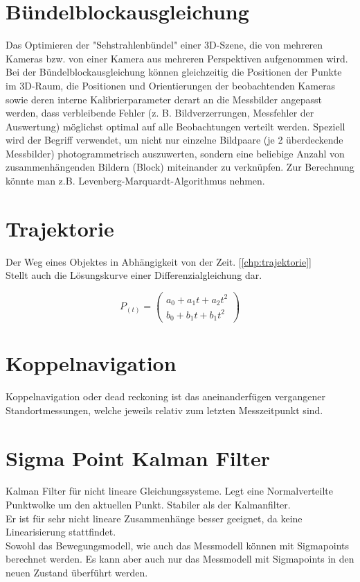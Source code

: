 \section{Bündelblockausgleichung}
\label{chp:stoffübersicht:sec:Bündelblockausgleichung}
Das Optimieren der "Sehstrahlenbündel" einer 3D-Szene, die von mehreren Kameras bzw. von einer Kamera aus mehreren Perspektiven
aufgenommen wird. Bei der Bündelblockausgleichung können gleichzeitig die Positionen der Punkte im 3D-Raum, die Positionen und
Orientierungen der beobachtenden Kameras sowie deren interne Kalibrierparameter derart an die Messbilder angepasst werden, dass
verbleibende Fehler (z. B. Bildverzerrungen, Messfehler der Auswertung) möglichst optimal auf alle Beobachtungen verteilt werden.
Speziell wird der Begriff verwendet, um nicht nur einzelne Bildpaare (je 2 überdeckende Messbilder) photogrammetrisch auszuwerten,
sondern eine beliebige Anzahl von zusammenhängenden Bildern (Block) miteinander zu verknüpfen. Zur Berechnung könnte man z.B.
Levenberg-Marquardt-Algorithmus nehmen. 

\section{Trajektorie}
\label{chp:stoffübersicht:sec:Trajektorie}
Der Weg eines Objektes in Abhängigkeit von der Zeit. [\ref{chp:trajektorie}]\\
Stellt auch die Lösungskurve einer Differenzialgleichung dar.

\begin{equation}
P_{(t)} = 
\left(
	\begin{array}{c}
	a_0 + a_1t + a_2t^2 \\
	b_0 + b_1t + b_1t^2
	\end{array} 
\right)
\end{equation} 

\section{Koppelnavigation}
\label{chp:stoffübersicht:sec:Koppelnavigation}
Koppelnavigation oder dead reckoning ist das aneinanderfügen vergangener Standortmessungen, welche jeweils relativ zum letzten Messzeitpunkt sind.

\section{Sigma Point Kalman Filter}
\label{chp:stoffübersicht:sec:SigmaPointKalmanFilter}
Kalman Filter für nicht lineare Gleichungssysteme. Legt eine Normalverteilte Punktwolke um den aktuellen Punkt. Stabiler als der Kalmanfilter.\\
Er ist für sehr nicht lineare Zusammenhänge besser geeignet, da keine Linearisierung stattfindet.\\
Sowohl das Bewegungsmodell, wie auch das Messmodell können mit Sigmapoints berechnet werden. Es kann aber auch nur  das Messmodell mit Sigmapoints in den neuen Zustand überführt werden.

